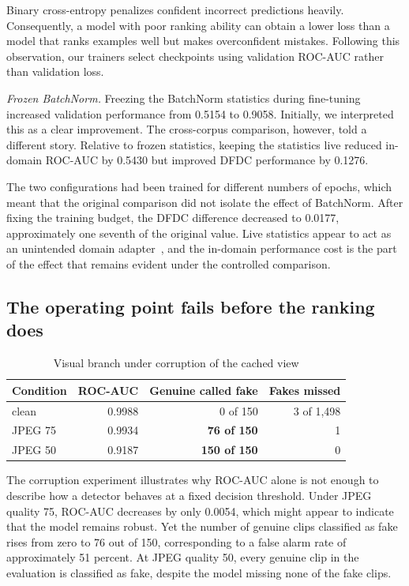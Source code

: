 \documentclass[conference]{IEEEtran}
\begin{document}
Binary cross-entropy penalizes confident incorrect predictions heavily.
Consequently, a model with poor ranking ability can obtain a lower loss than
a model that ranks examples well but makes overconfident mistakes. Following
this observation, our trainers select checkpoints using validation ROC-AUC
rather than validation loss.

\textit{Frozen BatchNorm.}
Freezing the BatchNorm statistics during fine-tuning increased validation
performance from 0.5154 to 0.9058. Initially, we interpreted this as a clear
improvement. The cross-corpus comparison, however, told a different story.
Relative to frozen statistics, keeping the statistics live reduced in-domain
ROC-AUC by 0.5430 but improved DFDC performance by 0.1276.

The two configurations had been trained for different numbers of epochs,
which meant that the original comparison did not isolate the effect of
BatchNorm. After fixing the training budget, the DFDC difference decreased
to 0.0177, approximately one seventh of the original value. Live statistics
appear to act as an unintended domain adapter~\cite{adabn}, and the
in-domain performance cost is the part of the effect that remains evident
under the controlled comparison.

\subsection{The operating point fails before the ranking does}

\begin{table}[htbp]
\caption{Visual branch under corruption of the cached view}
\label{tab:corruption}
\centering
\begin{tabular}{lrrr}
\toprule
Condition & ROC-AUC & Genuine called fake & Fakes missed \\
\midrule
clean & 0.9988 & 0 of 150 & 3 of 1,498 \\
JPEG 75 & 0.9934 & \textbf{76 of 150} & 1 \\
JPEG 50 & 0.9187 & \textbf{150 of 150} & 0 \\
\bottomrule
\end{tabular}
\end{table}

The corruption experiment illustrates why ROC-AUC alone is not enough to
describe how a detector behaves at a fixed decision threshold. Under JPEG
quality 75, ROC-AUC decreases by only 0.0054, which might appear to indicate
that the model remains robust. Yet the number of genuine clips classified as
fake rises from zero to 76 out of 150, corresponding to a false alarm rate of
approximately 51 percent. At JPEG quality 50, every genuine clip in the
evaluation is classified as fake, despite the model missing none of the fake
clips.
\end{document}

